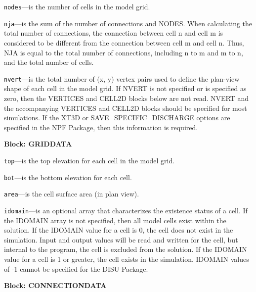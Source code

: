 \begin{description}
\item \texttt{nodes}---is the number of cells in the model grid.

\item \texttt{nja}---is the sum of the number of connections and NODES.  When calculating the total number of connections, the connection between cell n and cell m is considered to be different from the connection between cell m and cell n.  Thus, NJA is equal to the total number of connections, including n to m and m to n, and the total number of cells.

\item \texttt{nvert}---is the total number of (x, y) vertex pairs used to define the plan-view shape of each cell in the model grid.  If NVERT is not specified or is specified as zero, then the VERTICES and CELL2D blocks below are not read.  NVERT and the accompanying VERTICES and CELL2D blocks should be specified for most simulations.  If the XT3D or SAVE\_SPECIFIC\_DISCHARGE options are specified in the NPF Package, then this information is required.

\end{description}
\item \textbf{Block: GRIDDATA}

\begin{description}
\item \texttt{top}---is the top elevation for each cell in the model grid.

\item \texttt{bot}---is the bottom elevation for each cell.

\item \texttt{area}---is the cell surface area (in plan view).

\item \texttt{idomain}---is an optional array that characterizes the existence status of a cell.  If the IDOMAIN array is not specified, then all model cells exist within the solution.  If the IDOMAIN value for a cell is 0, the cell does not exist in the simulation.  Input and output values will be read and written for the cell, but internal to the program, the cell is excluded from the solution.  If the IDOMAIN value for a cell is 1 or greater, the cell exists in the simulation.  IDOMAIN values of -1 cannot be specified for the DISU Package.

\end{description}
\item \textbf{Block: CONNECTIONDATA}

